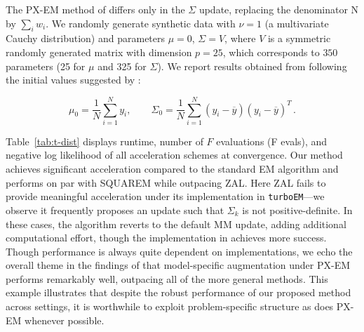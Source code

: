 \documentclass{statsoc}
\begin{document}
\begin{table}
    \caption{\label{tab:t-dist}%
    Multivariate t-distribution: maximum likelihood estimation of a 25-dimensional multivariate t-distribution. } 

    \centering
{}
\end{table}

 The PX-EM method of \cite{meng1997algorithm} differs only in the $\Sigma$ update, replacing the denominator N by $\sum_{i}w_i$. We randomly generate synthetic data with $\nu = 1$ (a multivariate Cauchy distribution) and parameters $\mu = 0$, $\Sigma = V$, where $V$ is a symmetric randomly generated matrix with dimension $p = 25$, which corresponds to $350$ parameters (25 for $\mu$ and 325 for $\Sigma$). %
  We report results obtained from following the initial values suggested by \cite{meng1997algorithm}:
 
 \begin{equation*}
     \mu_0 =  \dfrac{1}{N}\sum_{i=1}^{N}y_i, \qquad
     \Sigma_0 = \dfrac{1}{N}\sum_{i=1}^{N}(y_i - \overline{y})(y_i - \overline{y})^T\,.
 \end{equation*}
 
 Table~\ref{tab:t-dist} displays runtime, number of $F$ evaluations (F evals), and negative log likelihood of all acceleration schemes at convergence. Our method achieves significant acceleration compared to the standard EM algorithm and performs on par with SQUAREM while outpacing ZAL. Here ZAL fails to provide meaningful acceleration under its implementation in \texttt{turboEM}---we observe it frequently proposes an update such that $\Sigma_k$ is not positive-definite. In these cases, the algorithm reverts to the default MM update, adding additional computational effort, though the implementation in \cite{zhou2011quasi} achieves more success. Though performance is always quite dependent on implementations, we echo the overall theme in the findings of \cite{varadhan2008simple,zhou2011quasi} that  model-specific augmentation under PX-EM performs remarkably well, outpacing all of the more general methods. This example illustrates that despite the robust performance of our proposed method across settings, it is worthwhile to exploit problem-specific structure as does PX-EM whenever possible.
\end{document}
